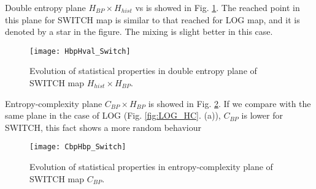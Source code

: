 Double entropy plane $H_{BP} \times H_{hist}$ vs  is showed in Fig. \ref{fig:SWITCH_HH}.
The reached point in this plane for SWITCH map is similar to that reached for LOG map, and it is denoted by a star in the figure.
The mixing is slight better in this case.

\begin{figure}
	\centering
	\texttt{[image: HbpHval\_Switch]}
	\caption{Evolution of statistical properties in double entropy plane of SWITCH map $H_{hist} \times H_{BP}$.}
	\label{fig:SWITCH_HH}
\end{figure}

Entropy-complexity plane $C_{BP} \times H_{BP}$ is showed in Fig. \ref{fig:SWITCH_HC}.
If we compare with the same plane in the case of LOG (Fig. \ref{fig:LOG_HC}. (a)), $C_{BP}$ is lower for SWITCH, this fact shows a more random behaviour

\begin{figure}
	\centering
	\texttt{[image: CbpHbp\_Switch]}
	\caption{Evolution of statistical properties in entropy-complexity plane of SWITCH map $C_{BP}$.}
	\label{fig:SWITCH_HC}
\end{figure}